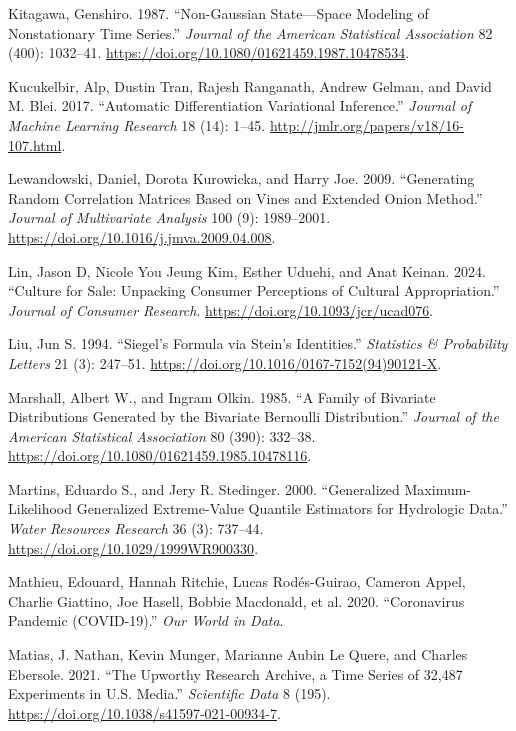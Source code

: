 \documentclass[
  11pt,
  letterpaper,
]{scrbook}
\newlength{\cslhangindent}
\newenvironment{CSLReferences}[2] %
 {\begin{list}{}{%
  \setlength{\itemindent}{0pt}
  \setlength{\leftmargin}{0pt}
  \setlength{\parsep}{0pt}
  \ifodd #1
   \setlength{\leftmargin}{\cslhangindent}
   \setlength{\itemindent}{-1\cslhangindent}
  \fi
  \setlength{\itemsep}{#2\baselineskip}}}
 {\end{list}}
\theoremstyle{plain}
\theoremstyle{definition}
\theoremstyle{definition}
\theoremstyle{plain}
\theoremstyle{plain}
\theoremstyle{definition}
\theoremstyle{remark}
\begin{document}
\begin{CSLReferences}{1}{0}
Kitagawa, Genshiro. 1987. {``Non-{G}aussian State---Space Modeling of
Nonstationary Time Series.''} \emph{Journal of the American Statistical
Association} 82 (400): 1032--41.
\url{https://doi.org/10.1080/01621459.1987.10478534}.

Kucukelbir, Alp, Dustin Tran, Rajesh Ranganath, Andrew Gelman, and David
M. Blei. 2017. {``Automatic Differentiation Variational Inference.''}
\emph{Journal of Machine Learning Research} 18 (14): 1--45.
\url{http://jmlr.org/papers/v18/16-107.html}.

Lewandowski, Daniel, Dorota Kurowicka, and Harry Joe. 2009.
{``Generating Random Correlation Matrices Based on Vines and Extended
Onion Method.''} \emph{Journal of Multivariate Analysis} 100 (9):
1989--2001. \url{https://doi.org/10.1016/j.jmva.2009.04.008}.

Lin, Jason D, Nicole You Jeung Kim, Esther Uduehi, and Anat Keinan.
2024. {``Culture for Sale: Unpacking Consumer Perceptions of Cultural
Appropriation.''} \emph{Journal of Consumer Research}.
\url{https://doi.org/10.1093/jcr/ucad076}.

Liu, Jun S. 1994. {``{S}iegel's Formula via {S}tein's Identities.''}
\emph{Statistics \& Probability Letters} 21 (3): 247--51.
\url{https://doi.org/10.1016/0167-7152(94)90121-X}.

Marshall, Albert W., and Ingram Olkin. 1985. {``A Family of Bivariate
Distributions Generated by the Bivariate {B}ernoulli Distribution.''}
\emph{Journal of the American Statistical Association} 80 (390):
332--38. \url{https://doi.org/10.1080/01621459.1985.10478116}.

Martins, Eduardo S., and Jery R. Stedinger. 2000. {``Generalized
Maximum-Likelihood Generalized Extreme-Value Quantile Estimators for
Hydrologic Data.''} \emph{Water Resources Research} 36 (3): 737--44.
\url{https://doi.org/10.1029/1999WR900330}.

Mathieu, Edouard, Hannah Ritchie, Lucas Rodés-Guirao, Cameron Appel,
Charlie Giattino, Joe Hasell, Bobbie Macdonald, et al. 2020.
{``Coronavirus Pandemic (COVID-19).''} \emph{Our World in Data}.

Matias, J. Nathan, Kevin Munger, Marianne Aubin Le Quere, and Charles
Ebersole. 2021. {``The {U}pworthy {R}esearch {A}rchive, a Time Series of
32,487 Experiments in {U.S.} Media.''} \emph{Scientific Data} 8 (195).
\url{https://doi.org/10.1038/s41597-021-00934-7}.


\end{CSLReferences}
\end{document}
